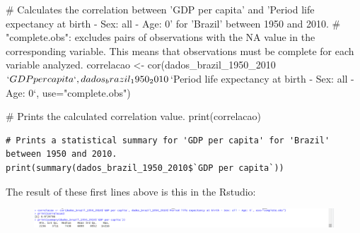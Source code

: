 \documentclass{article}
\begin{document}
\begin{spverbatim}

# Calculates the correlation between 'GDP per capita' and 'Period life expectancy at birth - Sex: all - Age: 0' for 'Brazil' between 1950 and 2010.
# "complete.obs": excludes pairs of observations with the NA value in the corresponding variable. This means that observations must be complete for each variable analyzed.
correlacao <- cor(dados_brazil_1950_2010$`GDP per capita`, dados_brazil_1950_2010$`Period life expectancy at birth - Sex: all - Age: 0`, use="complete.obs")

# Prints the calculated correlation value.
print(correlacao)
\end{spverbatim}

\begin{verbatim}
# Prints a statistical summary for 'GDP per capita' for 'Brazil' between 1950 and 2010.
print(summary(dados_brazil_1950_2010$`GDP per capita`))
\end{verbatim}
The result of these first lines above is this in the Rstudio:
\begin{figure}[H]
    \centering
    \includegraphics[width=1\linewidth]{imagesfolder/image15.png}
\end{figure}
\end{document}
